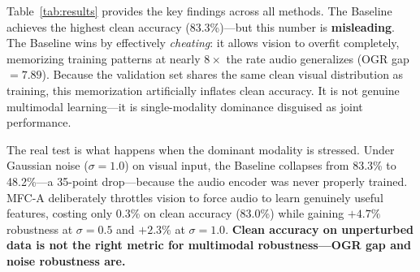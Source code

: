 \documentclass[10pt, twocolumn, letterpaper]{article}
\begin{document}
Table~\ref{tab:results} provides the key findings across all methods. The Baseline achieves the highest clean accuracy (83.3\%)---but this number is \textbf{misleading}. The Baseline wins by effectively \textit{cheating}: it allows vision to overfit completely, memorizing training patterns at nearly $8\times$ the rate audio generalizes (OGR gap $= 7.89$). Because the validation set shares the same clean visual distribution as training, this memorization artificially inflates clean accuracy. It is not genuine multimodal learning---it is single-modality dominance disguised as joint performance.

The real test is what happens when the dominant modality is stressed. Under Gaussian noise ($\sigma{=}1.0$) on visual input, the Baseline collapses from 83.3\% to 48.2\%---a 35-point drop---because the audio encoder was never properly trained. MFC-A deliberately throttles vision to force audio to learn genuinely useful features, costing only 0.3\% on clean accuracy (83.0\%) while gaining $+4.7\%$ robustness at $\sigma{=}0.5$ and $+2.3\%$ at $\sigma{=}1.0$. \textbf{Clean accuracy on unperturbed data is not the right metric for multimodal robustness---OGR gap and noise robustness are.}

\begin{table}[h]
\centering
{}
\caption{\textbf{Quantitative Benchmark Results.} Best validation accuracy, OGR Gap (the absolute difference between Vision and Audio OGR averaged over the final 5 epochs—lower means more balanced), and Robustness (accuracy when Gaussian noise $\sigma{=}1.0$ is injected into visual inputs). All numbers are from a controlled single-run experiment on the synthetic CIFAR-10/CREMA-D feature benchmark. MFC-A (InvOGR) achieves the best overall results: highest accuracy (83.0\%), best Rob@0.5 (72.9\%), best Rob@1.0 (50.5\%), and only \textbf{0.10\%} computational overhead. MFC variants (MFC, MFC+, MFC-A, MFC-C) all improve over Baseline on OGR balance. MFC-B achieves the lowest OGR gap (3.74) but at a 3.7\% accuracy cost. All MFC variants add \textbf{zero additional FLOPs} to the training loop (14.172 GFLOPs, identical to Baseline), versus Gradient Blending which costs $+12.6\%$ FLOPs for its probe run.}
\label{tab:results}
\end{table}
\end{document}
